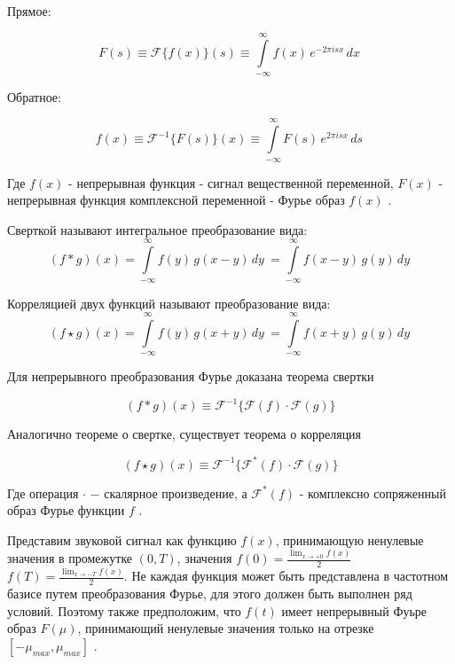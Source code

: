 \documentclass[oneside,final,14pt]{extreport}
\begin{document}
Прямое:

$$
\begin{equation}
F(s) 
\equiv
\mathcal{F}\{f(x)\}(s)
\equiv
{\int\limits_{-\infty}^{\infty}f(x)\,e^{-2\pi i s x}\,dx~}
\end{equation}
$$

Обратное: 

$$
\begin{equation}
f(x) 
\equiv
\mathcal{F}^{-1}\{F(s)\}(x)
\equiv
{\int\limits_{-\infty}^{\infty}F(s)\,e^{2\pi i s x}\,ds~}
\end{equation}
$$

Где $f(x)$ - непрерывная функция - сигнал вещественной переменной,
$F(x)$ - непрерывная функция комплексной переменной - Фурье образ $f(x)$ \cite{Gonzalez}. 

Сверткой называют интегральное преобразование вида:
$$
\begin{equation}
(f*g)(x)
=
{\int\limits_{-\infty}^{\infty} f(y)\,g(x-y)\,dy~} 
=
{\int\limits_{-\infty}^{\infty} f(x-y)\,g(y)\,dy~}  
\end{equation}
$$

Корреляцией двух функций называют преобразование вида:
$$
\begin{equation}
(f \star g)(x) 
= 
{\int\limits_{-\infty}^{\infty} f(y)\,g(x+y)\,dy~} 
= 
{\int\limits_{-\infty}^{\infty} f(x+y)\,g(y)\,dy~}  
\end{equation}
$$

Для непрерывного преобразования Фурье доказана теорема свертки 

$$
\begin{equation}
{(f*g)(x)}
\equiv
\mathcal{F}^{-1} \{
\mathcal{F}(f) \cdot \mathcal{F}(g) 
\}
\label{correlation_theorem}
\end{equation}
$$

Аналогично теореме о свертке, существует теорема о корреляция

$$
\begin{equation}
{(f \star g)(x)} 
\equiv
\mathcal{F}^{-1} \{
\mathcal{F}^*(f) \cdot \mathcal{F}(g) 
\}
\end{equation}
$$

Где операция \hspace{3pt} $\cdot$ \hspace{3pt} $-$ скалярное произведение, а $\mathcal{F}^*(f)$ - комплексно сопряженный образ Фурье функции $f$ .

Представим звуковой сигнал как функцию $f(x)$, принимающую ненулевые значения в промежутке $(0, T)$,
значения $f(0) = \frac{\lim_{x \to +0}f(x)}{2}$  $f(T) = \frac{\lim_{x \to -T}f(x)}{2}$. Не каждая функция может быть представлена в частотном базисе путем преобразования Фурье, для этого должен быть выполнен ряд условий\cite{Gonzalez}. Поэтому также предположим, что $f(t)$ имеет непрерывный Фуьре образ $F(\mu)$, принимающий ненулевые значения только на отрезке $[-\mu_{max}, \mu_{max}]$ . 
\end{document}
